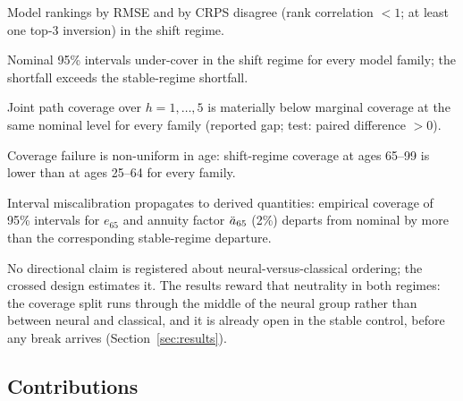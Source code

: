\begin{hypothesis}[H1]
Model rankings by RMSE and by CRPS disagree (rank correlation $<1$; at least
one top-3 inversion) in the shift regime.
\end{hypothesis}
\begin{hypothesis}[H2]
Nominal 95\% intervals under-cover in the shift regime for every model
family; the shortfall exceeds the stable-regime shortfall.
\end{hypothesis}
\begin{hypothesis}[H3]
Joint path coverage over $h = 1,\dots,5$ is materially below marginal
coverage at the same nominal level for every family (reported gap; test:
paired difference $>0$).
\end{hypothesis}
\begin{hypothesis}[H4]
Coverage failure is non-uniform in age: shift-regime coverage at ages 65--99
is lower than at ages 25--64 for every family.
\end{hypothesis}
\begin{hypothesis}[H5]
Interval miscalibration propagates to derived quantities: empirical coverage
of 95\% intervals for $e_{65}$ and annuity factor $\ddot{a}_{65}$ (2\%) departs
from nominal by more than the corresponding stable-regime departure.
\end{hypothesis}

No directional claim is registered about neural-versus-classical ordering;
the crossed design estimates it. The results reward that neutrality in both
regimes: the coverage split runs through the middle of the neural group
rather than between neural and classical, and it is already open in the
stable control, before any break arrives (Section~\ref{sec:results}).

\subsection{Contributions}

